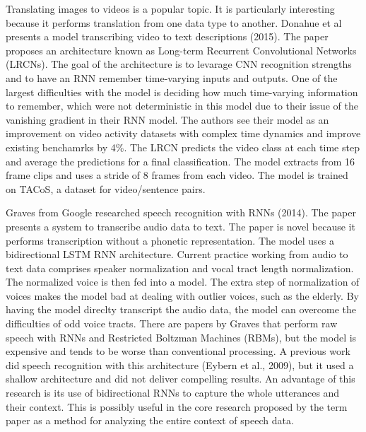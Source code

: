 Translating images to videos is a popular topic.  It is particularly interesting because it performs translation from one data type to another.  Donahue et al presents a model transcribing video to text descriptions (2015).  The paper proposes an architecture known as Long-term Recurrent Convolutional Networks (LRCNs).  The goal of the architecture is to levarage CNN recognition strengths and to have an RNN remember time-varying inputs and outputs. One of the largest difficulties with the model is deciding how much time-varying information to remember, which were not deterministic in this model due to their issue of the vanishing gradient in their RNN model.  The authors see their model as an improvement on video activity datasets with complex time dynamics and improve existing benchamrks by 4\%.  The LRCN predicts the video class at each time step and average the predictions for a final classification.  The model extracts from 16 frame clips and uses a stride of 8 frames from each video.  The model is trained on TACoS, a dataset for video/sentence pairs.

Graves from Google researched speech recognition with RNNs (2014).  The paper presents a system to transcribe audio data to text.  The paper is novel because it performs transcription without a phonetic representation.  The model uses a bidirectional LSTM RNN architecture.  Current practice working from audio to text data comprises speaker normalization and vocal tract length normalization.  The normalized voice is then fed into a model.  The extra step of normalization of voices makes the model bad at dealing with outlier voices, such as the elderly.  By having the model direclty transcript the audio data, the model can overcome the difficulties of odd voice tracts.  There are papers by Graves that perform raw speech with RNNs and Restricted Boltzman Machines (RBMs), but the model is expensive and tends to be worse than conventional processing.  A previous work did speech recognition with this architecture (Eybern et al., 2009), but it used a shallow architecture and did not deliver compelling results. An advantage of this research is its use of bidirectional RNNs to capture the whole utterances and their context.  This is possibly useful in the core research proposed by the term paper as a method for analyzing the entire context of speech data.


